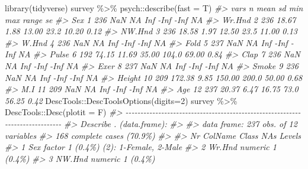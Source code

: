\documentclass[
]{book}
\newenvironment{Shaded}{\begin{snugshade}}{\end{snugshade}}
\newcommand{\AttributeTok}[1]{\textcolor[rgb]{0.77,0.63,0.00}{#1}}
\newcommand{\CommentTok}[1]{\textcolor[rgb]{0.56,0.35,0.01}{\textit{#1}}}
\newcommand{\DecValTok}[1]{\textcolor[rgb]{0.00,0.00,0.81}{#1}}
\newcommand{\FunctionTok}[1]{\textcolor[rgb]{0.00,0.00,0.00}{#1}}
\newcommand{\NormalTok}[1]{#1}
\newcommand{\SpecialCharTok}[1]{\textcolor[rgb]{0.00,0.00,0.00}{#1}}
\begin{document}
\begin{Shaded}
\begin{Highlighting}[]
\FunctionTok{library}\NormalTok{(tidyverse)}
\NormalTok{survey }\SpecialCharTok{\%\textgreater{}\%}\NormalTok{ psych}\SpecialCharTok{::}\FunctionTok{describe}\NormalTok{(}\AttributeTok{fast =}\NormalTok{ T)}
\CommentTok{\#\textgreater{}        vars   n   mean    sd    min   max range   se}
\CommentTok{\#\textgreater{} Sex       1 236    NaN    NA    Inf  {-}Inf  {-}Inf   NA}
\CommentTok{\#\textgreater{} Wr.Hnd    2 236  18.67  1.88  13.00  23.2 10.20 0.12}
\CommentTok{\#\textgreater{} NW.Hnd    3 236  18.58  1.97  12.50  23.5 11.00 0.13}
\CommentTok{\#\textgreater{} W.Hnd     4 236    NaN    NA    Inf  {-}Inf  {-}Inf   NA}
\CommentTok{\#\textgreater{} Fold      5 237    NaN    NA    Inf  {-}Inf  {-}Inf   NA}
\CommentTok{\#\textgreater{} Pulse     6 192  74.15 11.69  35.00 104.0 69.00 0.84}
\CommentTok{\#\textgreater{} Clap      7 236    NaN    NA    Inf  {-}Inf  {-}Inf   NA}
\CommentTok{\#\textgreater{} Exer      8 237    NaN    NA    Inf  {-}Inf  {-}Inf   NA}
\CommentTok{\#\textgreater{} Smoke     9 236    NaN    NA    Inf  {-}Inf  {-}Inf   NA}
\CommentTok{\#\textgreater{} Height   10 209 172.38  9.85 150.00 200.0 50.00 0.68}
\CommentTok{\#\textgreater{} M.I      11 209    NaN    NA    Inf  {-}Inf  {-}Inf   NA}
\CommentTok{\#\textgreater{} Age      12 237  20.37  6.47  16.75  73.0 56.25 0.42}
\NormalTok{DescTools}\SpecialCharTok{::}\FunctionTok{DescToolsOptions}\NormalTok{(}\AttributeTok{digits=}\DecValTok{2}\NormalTok{)}
\NormalTok{survey }\SpecialCharTok{\%\textgreater{}\%}\NormalTok{ DescTools}\SpecialCharTok{::}\FunctionTok{Desc}\NormalTok{(}\AttributeTok{plotit =}\NormalTok{ F)}
\CommentTok{\#\textgreater{} {-}{-}{-}{-}{-}{-}{-}{-}{-}{-}{-}{-}{-}{-}{-}{-}{-}{-}{-}{-}{-}{-}{-}{-}{-}{-}{-}{-}{-}{-}{-}{-}{-}{-}{-}{-}{-}{-}{-}{-}{-}{-}{-}{-}{-}{-}{-}{-}{-}{-}{-}{-}{-}{-}{-}{-}{-}{-}{-}{-}{-}{-}{-}{-}{-}{-}{-}{-}{-}{-}{-}{-}{-}{-}{-}{-}{-}{-} }
\CommentTok{\#\textgreater{} Describe . (data.frame):}
\CommentTok{\#\textgreater{} }
\CommentTok{\#\textgreater{} data frame:  237 obs. of  12 variables}
\CommentTok{\#\textgreater{}      168 complete cases (70.9\%)}
\CommentTok{\#\textgreater{} }
\CommentTok{\#\textgreater{}   Nr  ColName  Class            NAs         Levels                       }
\CommentTok{\#\textgreater{}   1   Sex      factor            1 (0.4\%)   (2): 1{-}Female, 2{-}Male        }
\CommentTok{\#\textgreater{}   2   Wr.Hnd   numeric           1 (0.4\%)                                }
\CommentTok{\#\textgreater{}   3   NW.Hnd   numeric           1 (0.4\%)                                }

\end{Highlighting}
\end{Shaded}
\end{document}
